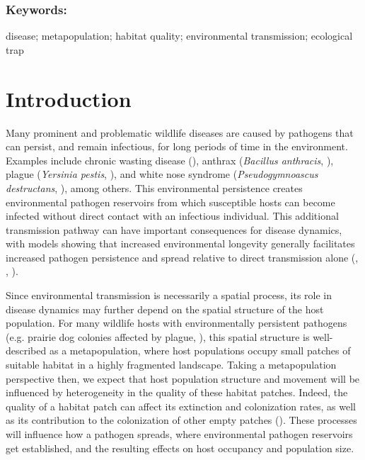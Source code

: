 \documentclass{article}
\begin{document}
\subsubsection*{Keywords:}
disease; metapopulation; habitat quality; environmental transmission; ecological trap

\section{Introduction}
\label{intro}

Many prominent and problematic wildlife diseases are caused by pathogens that can persist, and remain infectious, for long periods of time in the environment.  Examples include chronic wasting disease (\cite{Miller2006}), anthrax (\emph{Bacillus anthracis}, \cite{Dragon1995}), plague (\emph{Yersinia pestis}, \cite{Eisen2008}), and white nose syndrome (\emph{Pseudogymnoascus destructans}, \cite{Reynolds2015}), among others.  This environmental persistence creates environmental pathogen reservoirs from which susceptible hosts can become infected without direct contact with an infectious individual.  This additional transmission pathway can have important consequences for disease dynamics, with models showing that increased environmental longevity generally facilitates increased pathogen persistence and spread relative to direct transmission alone (\cite{Almberg2011}, \cite{Sharp2011}, \cite{Breban2009}). 

Since environmental transmission is necessarily a spatial process, its role in disease dynamics may further depend on the spatial structure of the host population.
For many wildlife hosts with environmentally persistent pathogens (e.g. prairie dog colonies affected by plague, \cite{George2013}), this spatial structure is well-described as a metapopulation, where host populations occupy small patches of suitable habitat in a highly fragmented landscape.
Taking a metapopulation perspective then, we expect that host population structure and movement will be influenced by heterogeneity in the quality of these habitat patches.  Indeed, the quality of a habitat patch can affect its extinction and colonization rates, as well as its contribution to the colonization of other empty patches (\cite{Moilanen1998}).  These processes will influence how a pathogen spreads, where environmental pathogen reservoirs get established, and the resulting effects on host occupancy and population size.  
\end{document}
